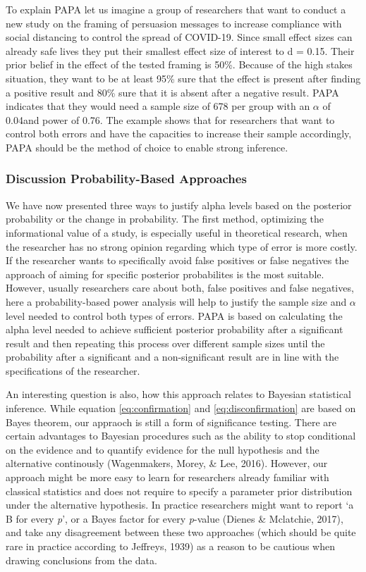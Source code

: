 \documentclass[
  english,
  ,jou,floatsintext]{apa6}
\begin{document}
To explain PAPA let us imagine a group of researchers that want to conduct a new study on the framing of persuasion messages to increase compliance with social distancing to control the spread of COVID-19. Since small effect sizes can already safe lives they put their smallest effect size of interest to d = 0.15. Their prior belief in the effect of the tested framing is 50\%. Because of the high stakes situation, they want to be at least 95\% sure that the effect is present after finding a positive result and 80\% sure that it is absent after a negative result.
PAPA indicates that they would need a sample size of 678 per group with an \(\alpha\) of 0.04and power of 0.76.
The example shows that for researchers that want to control both errors and have the capacities to increase their sample accordingly, PAPA should be the method of choice to enable strong inference.

\hypertarget{discussion-probability-based-approaches}{%
\subsubsection{Discussion Probability-Based Approaches}\label{discussion-probability-based-approaches}}

We have now presented three ways to justify alpha levels based on the posterior probability or the change in probability. The first method, optimizing the informational value of a study, is especially useful in theoretical research, when the researcher has no strong opinion regarding which type of error is more costly. If the researcher wants to specifically avoid false positives or false negatives the approach of aiming for specific posterior probabilites is the most suitable. However, usually researchers care about both, false positives and false negatives, here a probability-based power analysis will help to justify the sample size and \(\alpha\) level needed to control both types of errors. PAPA is based on calculating the alpha level needed to achieve sufficient posterior probability after a significant result and then repeating this process over different sample sizes until the probability after a significant and a non-significant result are in line with the specifications of the researcher.

An interesting question is also, how this approach relates to Bayesian statistical inference. While equation \ref{eq:confirmation} and \ref{eq:disconfirmation} are based on Bayes theorem, our appraoch is still a form of significance testing. There are certain advantages to Bayesian procedures such as the ability to stop conditional on the evidence and to quantify evidence for the null hypothesis and the alternative continously (Wagenmakers, Morey, \& Lee, 2016). However, our approach might be more easy to learn for researchers already familiar with classical statistics and does not require to specify a parameter prior distribution under the alternative hypothesis. In practice researchers might want to report `a B for every \emph{p}', or a Bayes factor for every \emph{p}-value (Dienes \& Mclatchie, 2017), and take any disagreement between these two approaches (which should be quite rare in practice according to Jeffreys, 1939) as a reason to be cautious when drawing conclusions from the data.
\end{document}
